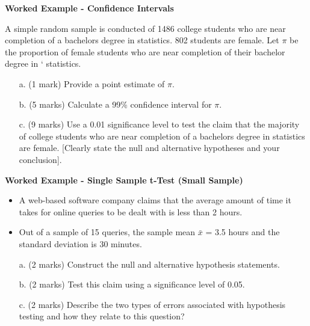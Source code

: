 \item \textbf{Worked Example   - Confidence Intervals}

A simple random sample is conducted of 1486 college students who are near completion of a bachelors degree in statistics. 802 students are female. Let $\pi$ be the proportion of female students who are near completion of their bachelor degree in `
statistics.
\begin{itemize}
\item[a.] (1 mark) Provide a point estimate of $\pi$.
\item[b.] (5 marks) Calculate a 99\% confidence interval for $\pi$.
\item[c.] (9 marks) Use a 0.01 significance level to test the claim that the majority of
college students who are near completion of a bachelors degree in statistics are
female. [Clearly state the null and alternative hypotheses and your conclusion].\end{itemize}


\item \textbf{Worked Example  - Single Sample t-Test (Small Sample)  } \\ %
\begin{itemize}
\item A web-based software company claims that the average amount of time it takes for
online queries to be dealt with is less than 2 hours. 
\item Out of a sample of 15 queries, the
sample mean $\bar{x}$ = 3.5 hours and the standard deviation is 30 minutes.
\end{itemize}

\begin{itemize}
\item[a.](2 marks) Construct the null and alternative hypothesis statements.
\item[b.](2 marks) Test this claim using a significance level of 0.05.
\item[c.](2 marks) Describe the two types of errors associated with hypothesis testing and how
they relate to this question?
\end{itemize}

